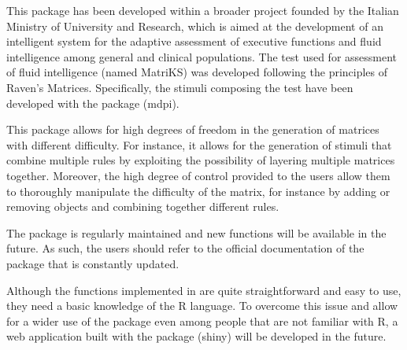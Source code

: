This package has been developed within a broader project founded by the Italian Ministry of University and Research, which is aimed at the development of an intelligent system for the adaptive assessment of executive functions and fluid intelligence among general and clinical populations.
The test used for assessment of fluid intelligence (named MatriKS) was developed following the principles of Raven's Matrices.
Specifically, the stimuli composing the test have been developed with the  package (mdpi).

This package allows for high degrees of freedom in the generation of matrices with different difficulty.
For instance, it allows for the generation of stimuli that combine multiple rules by exploiting the possibility of layering multiple matrices together.
Moreover, the high degree of control provided to the users allow them to thoroughly manipulate the difficulty of the matrix, for instance by adding or removing objects and combining together different rules.

The package is regularly maintained and new functions will be available in the future.
As such, the users should refer to the official documentation of the package that is constantly updated.

Although the functions implemented in  are quite straightforward and easy to use, they need a basic knowledge of the R language.
To overcome this issue and allow for a wider use of the package even among people that are not familiar with R, a web application built with the  package (shiny) will be developed in the future.


\address{%
Quietest Quokka\\
University of Little Mates\\%
Department of Letter Q\\ Somewhere, Australia\\
%
\url{https://www.britannica.com/animal/quokka}\\%
\textit{ORCiD: \href{https://orcid.org/0000-1721-1511-1101}{0000-1721-1511-1101}}\\%
\href{mailto:qquo@ulm.edu}{\nolinkurl{qquo@ulm.edu}}%
}

\address{%
Bounciest Bilby\\
University of Little MatesUniversity of Aussie Animals\\%
Department of Letter Q, Somewhere, Australia\\ Department of Marsupials, Somewhere, Australia\\
%
\url{https://www.britannica.com/animal/bilby}\\%
\textit{ORCiD: \href{https://orcid.org/0000-0002-0912-0225}{0000-0002-0912-0225}}\\%
\href{mailto:bbil@ulm.edu}{\nolinkurl{bbil@ulm.edu}}%
}
